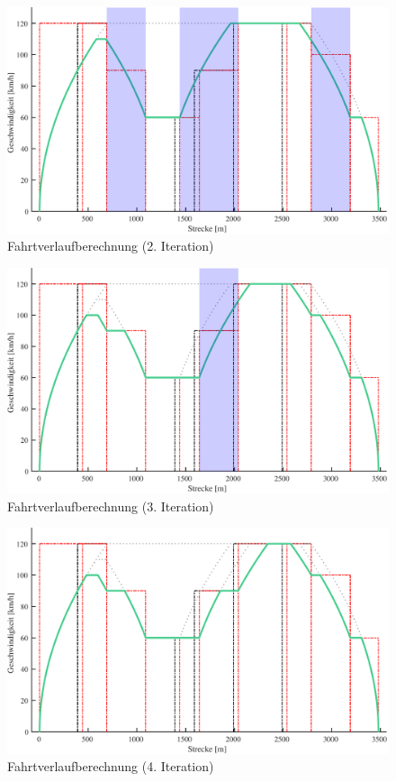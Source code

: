 \begin{figure}
  \includegraphics[width=\linewidth]{../matlab/it4.pdf}
  \caption{Fahrtverlaufberechnung (2. Iteration)}
  \label{fig:it4}
\end{figure}

\begin{figure}
  \includegraphics[width=\linewidth]{../matlab/it5.pdf}
  \caption{Fahrtverlaufberechnung (3. Iteration)}
  \label{fig:it5}
\end{figure}

\begin{figure}
  \includegraphics[width=\linewidth]{../matlab/it6.pdf}
  \caption{Fahrtverlaufberechnung (4. Iteration)}
  \label{fig:it6}
\end{figure}

